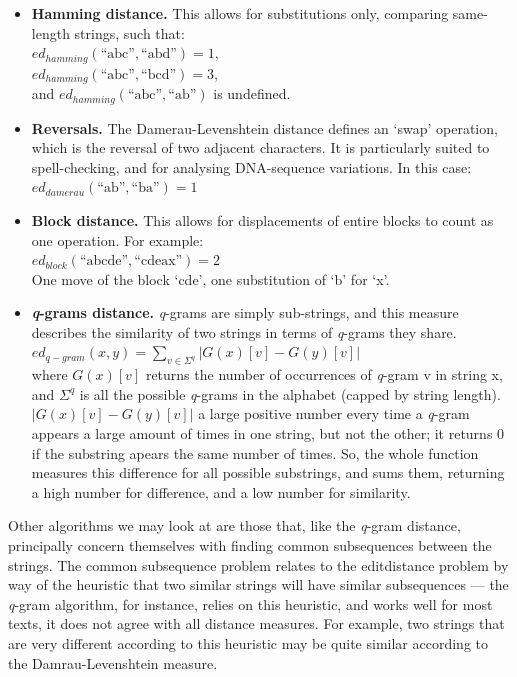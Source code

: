 \begin{itemize}
\item \textbf{Hamming distance.} This allows for substitutions only,
  comparing same-length strings, such
  that:\\ $ed_{hamming}(\text{``abc''},\text{``abd''})
  =1$,\\ $ed_{hamming}(\text{``abc''},\text{``bcd''}) = 3$,\\ and
  $ed_{hamming}(\text{``abc''},\text{``ab''})$ is
  undefined.\cite{Hamming1950}
\item \textbf{Reversals.} The Damerau-Levenshtein distance defines an
  `swap' operation, which is the reversal of two adjacent
  characters. It is particularly suited to spell-checking, and for
  analysing DNA-sequence variations. In this
  case:\\ $ed_{damerau}(\text{``ab''},\text{``ba''}) = 1$
\item \textbf{Block distance.} This allows for displacements of entire
  blocks to count as one operation. For
  example:\\ $ed_{block}(\text{``abcde''},\text{``cdeax''})= 2$ \\ One
  move of the block `cde', one substitution of `b' for
  `x'.\cite{Tichy1984}
\item \textbf{\textit{q}-grams distance.} \textit{q}-grams are simply
  sub-strings, and this measure describes the similarity of two
  strings in terms of \textit{q}-grams they
  share.\cite{Ukkonen1992}\\ $ed_{q-gram}(x,y)=\sum\limits_{v\in\Sigma
    ^q}|G(x)[v]-G(y)[v]|$\\ where $G(x)[v]$ returns the number of
  occurrences of \textit{q}-gram v in string x, and $\Sigma ^q$ is all
  the possible \textit{q}-grams in the alphabet (capped by string
  length). $|G(x)[v]-G(y)[v]|$ a large positive number every time a
  \textit{q}-gram appears a large amount of times in one string, but
  not the other; it returns 0 if the substring apears the same number
  of times. So, the whole function measures this difference for all
  possible substrings, and sums them, returning a high number for
  difference, and a low number for similarity.
\end{itemize}

Other algorithms we may look at are those that, like the
\textit{q}-gram distance, principally concern themselves with finding
common subsequences between the strings. The common subsequence
problem relates to the editdistance problem by way of the
heuristic that two similar strings will have similar subsequences ---
the \textit{q}-gram algorithm, for instance, relies on this heuristic,
and works well for most texts, it does not agree with all distance
measures. For example, two strings that are very different according
to this heuristic may be quite similar according to the
Damrau-Levenshtein measure.

